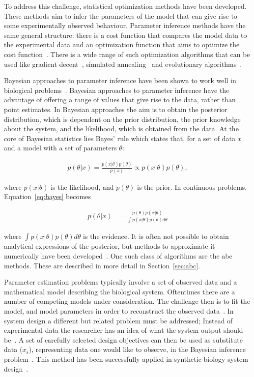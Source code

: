 To address this challenge, statistical optimization methods have been developed. These methods aim to infer the parameters of the model that can give rise to some experimentally observed behaviour. Parameter inference methods have the same general structure: there is a cost function that compares the model data to the experimental data and an optimization function that aims to optimize the cost function~\autocite{Toni:2010}. There is a wide range of such optimization algorithms that can be used like gradient decent~\autocite{Levenberg:1944we, Marquardt:1963wr}, simulated annealing~\autocite{Kirkpatrick:1983kv} and evolutionary algorithms~\autocite{Onbasoglu:2001um, Wood:2002uo}.  

Bayesian approaches to parameter inference have been shown to work well in biological problems~\autocite{Barnes:2011hh, Toni:2010, Liepe:2014iw}. Bayesian approaches to parameter inference have the advantage of offering a range of values that give rise to the data, rather than point estimates. In Bayesian approaches the aim is to obtain the posterior distribution, which is dependent on the prior distribution, the prior knowledge about the system, and the likelihood, which is obtained from the data. At the core of Bayesian statistics lies Bayes' rule which states that, for a set of data $x$ and a model with a set of parameters $θ$:

\begin{align}
	p(θ|x) = \frac{p(x|θ)p(θ)}{p(x)} \propto p(x|θ)p(θ), \label{eq:bayes}
\end{align}



\noindent where $p(x|θ)$ is the likelihood, and $p(θ)$ is the prior. In continuous problems, Equation~\ref{eq:bayes} becomes

\begin{align}%
	p(θ|x) &= \frac{p(θ)p(x|θ)}{\int p(x|θ)p(θ)dθ}
\end{align}


\noindent where $\displaystyle \int p(x|θ)p(θ)dθ$ is the evidence. It is often not possible to obtain analytical expressions of the posterior, but methods to approximate it numerically have been developed~\autocite{Barnes:2011bk}. One such class of algorithms are the \acrfull{abc} methods. These are described in more detail in Section~\ref{sec:abc}.


Parameter estimation problems typically involve a set of observed data and a mathematical model describing the biological system. Oftentimes there are a number of competing models under consideration. The challenge then is to fit the model, and model parameters in order to reconstruct the observed data~\autocite{Ma:2009ig}. In system design a different but related problem must be addressed; Instead of experimental data the researcher has an idea of what the system output should be~\autocite{Barnes:2011bk}. A set of carefully selected design objectives can then be used as substitute data ($x_s$), representing data one would like to observe, in the Bayesian inference problem~\autocite{Barnes:2011bk}. This method has been successfully applied in synthetic biology system design~\autocite{Barnes:2011hh, Woods:2016eh}. 

